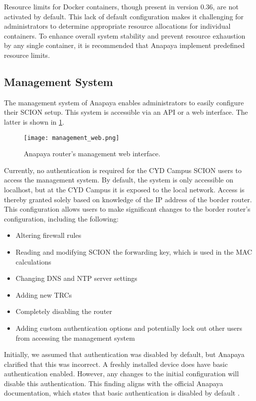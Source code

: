 Resource limits for Docker containers, though present in version 0.36, are not activated by default.
This lack of default configuration makes it challenging for administrators to determine appropriate resource allocations for individual containers.
To enhance overall system stability and prevent resource exhaustion by any single container, it is recommended that Anapaya implement predefined resource limits.


\subsection{Management System}
\label{sec:management-system}
The management system of Anapaya enables administrators to easily configure their SCION setup.
This system is accessible via an API or a web interface.
The latter is shown in \cref{fig:anapaya_web_interface}.

\begin{figure}[h]
    \centering
    \texttt{[image: management\_web.png]}
    \caption{Anapaya router's management web interface.}
    \label{fig:anapaya_web_interface}
\end{figure}

Currently, no authentication is required for the CYD Campus SCION users to access the management system.
By default, the system is only accessible on localhost, but at the CYD Campus it is exposed to the local network.
Access is thereby granted solely based on knowledge of the IP address of the border router.
\newpage
This configuration allows users to make significant changes to the border router's configuration, including the following:

\begin{itemize}
    \item Altering firewall rules
    \item Reading and modifying SCION the forwarding key, which is used in the MAC calculations
    \item Changing DNS and NTP server settings
    \item Adding new TRCs
    \item Completely disabling the router
    \item Adding custom authentication options and potentially lock out other users from accessing the management system
\end{itemize}

Initially, we assumed that authentication was disabled by default, but Anapaya clarified that this was incorrect.
A freshly installed device does have basic authentication enabled.
However, any changes to the initial configuration will disable this authentication.
This finding aligns with the official Anapaya documentation, which states that basic authentication is disabled by default \cite{anapayaManagemenDoc}.

